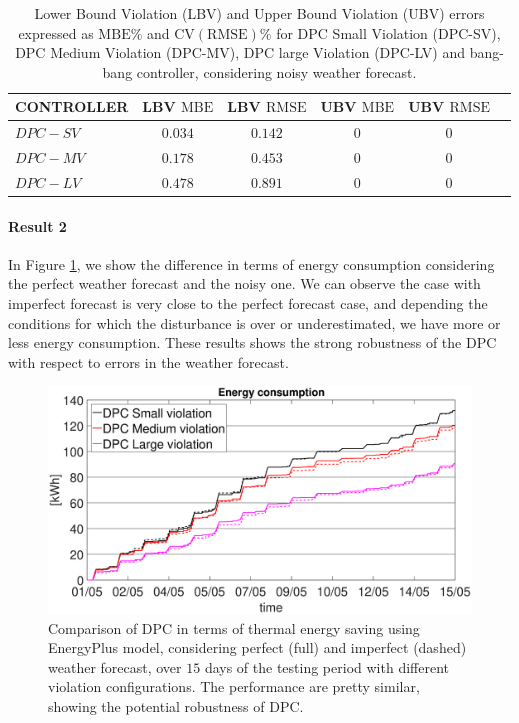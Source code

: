 \begin{table}[t!]
	\centering
	\textcolor[rgb]{0,0,1}{\begin{tabular}{lccccc}
		\toprule
		CONTROLLER  & LBV $\mathrm{MBE}$  & LBV $\mathrm{RMSE}$ & UBV $\mathrm{MBE}$ & UBV $\mathrm{RMSE}$ 	\\ 
		\midrule
		$DPC-SV$    & $0.034$             & $0.142$  			      & $0$    				 & $0$     	  	\\
		$DPC-MV$    & $0.178$ 			  & $0.453$       			  & $0$    				 & $0$		  	\\
		$DPC-LV$    & $0.478$  			  & $0.891$     			  & $0$    				 & $0$	      	\\
		\bottomrule
	\end{tabular}}
	\caption{\textcolor[rgb]{0,0,1}{Lower Bound Violation (LBV) and Upper Bound Violation (UBV) errors expressed as $\mathrm{MBE}\%$ and $\mathrm{CV(RMSE)}\%$ for DPC Small Violation (DPC-SV), DPC Medium Violation (DPC-MV), DPC large Violation (DPC-LV) and bang-bang controller, considering noisy weather forecast.}}
	\captionsetup{justification=centering}
	\label{T:violationErrorsNoisy}
\end{table}


\textcolor[rgb]{0,0,1}{\paragraph{Result 2} 
In Figure \ref{F:comparison_all_energy_E+_noisy}, we show the difference in terms of energy consumption considering the perfect weather forecast and the noisy one.
We can observe the case with imperfect forecast is very close to the perfect forecast case, and depending the conditions for which the disturbance is over or underestimated, we have more or less energy consumption. These results shows the strong robustness of the DPC with respect to errors in the weather forecast.}
\begin{figure}[t!]
	\begin{center}
		\includegraphics[width=28pc]{figures/Energy_all_EnergyPlus_noisy.eps}
	\end{center}
	\caption{\textcolor[rgb]{0,0,1}{Comparison of DPC in terms of thermal energy saving using EnergyPlus model, considering perfect (full) and imperfect (dashed) weather forecast, over $15$ days of the testing period with different violation configurations. The performance are pretty similar, showing the potential robustness of DPC.}}
	\label{F:comparison_all_energy_E+_noisy}
\end{figure}
